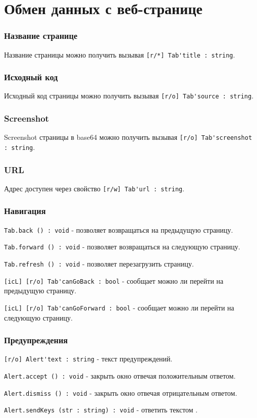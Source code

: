 \section{Обмен данных с веб-странице}
\label{dataexchange}

\subsubsection{Название странице}

Название страницы можно получить вызывая \lstinline|[r/*] Tab'title : string|.

\subsubsection{Исходный код}

Исходный код страницы можно получить вызывая \lstinline|[r/o] Tab'source : string|.

\subsubsection{Screenshot}

Screenshot страницы в base64 можно получить вызывая \lstinline|[r/o] Tab'screenshot : string|.

\subsubsection{URL}

Адрес доступен через свойство \lstinline|[r/w] Tab'url : string|.

\subsubsection{Навигация}

\lstinline|Tab.back () : void| - позволяет возвращаться на предыдущую страницу.

\lstinline|Tab.forward () : void| - позволяет возвращаться на следующую страницу.

\lstinline|Tab.refresh () : void| -  позволяет перезагрузить страницу.

\lstinline|[icL] [r/o] Tab'canGoBack : bool| - сообщает можно ли перейти на предыдущую страницу.

\lstinline|[icL] [r/o] Tab'canGoForward : bool| - сообщает можно ли перейти на следующую страницу.


\subsubsection{Предупреждения}

\lstinline|[r/o] Alert'text : string| - текст предупреждений.

\lstinline|Alert.accept () : void| - закрыть окно отвечая положительным ответом.

\lstinline|Alert.dismiss () : void| - закрыть окно отвечая отрицательным ответом.

\lstinline|Alert.sendKeys (str : string) : void| - ответить текстом .


